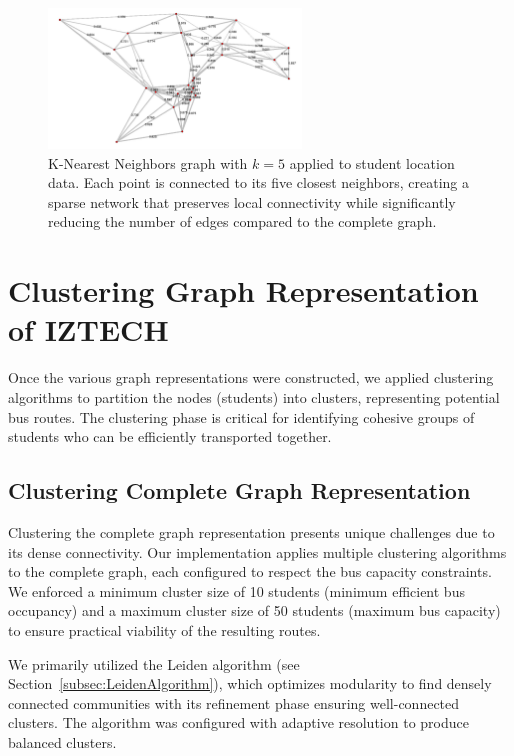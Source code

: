 \begin{figure}[!htbp]
\centering
\includegraphics[width=0.6\textwidth]{img/k_nearest}
\caption{K-Nearest Neighbors graph with $k=5$ applied to student location data. Each point is connected to its five closest neighbors, creating a sparse network that preserves local connectivity while significantly reducing the number of edges compared to the complete graph.}
\label{fig:knn_graph}
\end{figure}

\section{Clustering Graph Representation of IZTECH}
\label{sec:clustering_graph}

Once the various graph representations were constructed, we applied clustering algorithms to partition the nodes (students) into clusters, representing potential bus routes. The clustering phase is critical for identifying cohesive groups of students who can be efficiently transported together.

\subsection{Clustering Complete Graph Representation}
\label{subsec:clustering_complete}

Clustering the complete graph representation presents unique challenges due to its dense connectivity. Our implementation applies multiple clustering algorithms to the complete graph, each configured to respect the bus capacity constraints. We enforced a minimum cluster size of 10 students (minimum efficient bus occupancy) and a maximum cluster size of 50 students (maximum bus capacity) to ensure practical viability of the resulting routes.

We primarily utilized the Leiden algorithm (see Section~\ref{subsec:LeidenAlgorithm}), which optimizes modularity to find densely connected communities with its refinement phase ensuring well-connected clusters. The algorithm was configured with adaptive resolution to produce balanced clusters.

